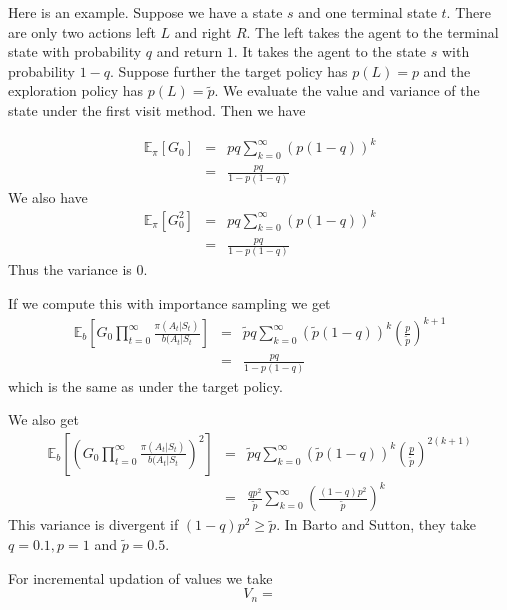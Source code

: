 \documentclass[11pt,a4paper]{article}
\newcommand\be{\begin{equation}}
\newcommand\bea{\begin{eqnarray}}
\newcommand\ee{\end{equation}}
\newcommand\eea{\end{eqnarray}}
\newcommand{\nn}{\nonumber \\}
\begin{document}
Here is an example. Suppose we have a state $s$ and one terminal state $t$. There are only two actions left $L$ and right $R$. The left takes the agent to the terminal state with probability $q$ and return $1$. It takes the agent to the state $s$ with probability $1-q$. Suppose further the target policy has $p(L)=p$ and the exploration policy has $p(L)=\tilde p$. We evaluate the value and variance of the state under the first visit method. Then we have

\bea
\mathbb E_\pi[G_0] &=& pq \sum_{k=0}^\infty (p (1-q))^k \nn
&=& \frac{pq}{1-p(1-q)}
\eea
We also have
\bea
\mathbb E_\pi[G_0^2] &=& pq \sum_{k=0}^\infty (p (1-q))^k \nn
&=& \frac{pq}{1-p(1-q)}
\eea
Thus the variance is 0.

If we compute this with importance sampling we get
\bea
\mathbb E_b[G_0 \prod_{t=0}^\infty \frac{\pi(A_t|S_t)}{b(A_t|S_t}] &=& \tilde pq \sum_{k=0}^\infty (\tilde p (1-q))^k \left( \frac{p}{\tilde p} \right)^{k+1} \nn
&=& \frac{pq}{1-p(1-q)}
\eea
which is the same as under the target policy.

We also get
\bea
\mathbb E_b[\left(G_0 \prod_{t=0}^\infty \frac{\pi(A_t|S_t)}{b(A_t|S_t}\right)^2] &=& \tilde pq \sum_{k=0}^\infty (\tilde p (1-q))^k \left( \frac{p}{\tilde p} \right)^{2(k+1)} \nn
&=& \frac{qp^2}{\tilde p} \sum_{k=0}^\infty \left( \frac{(1-q) p^2}{\tilde p}\right)^k
\eea
This variance is divergent if $(1-q)p^2 \ge \tilde p$. In Barto and Sutton, they take $q=0.1, p=1$ and $\tilde p=0.5$.

For incremental updation of values we take
\be
V_n = 
\ee
\end{document}
